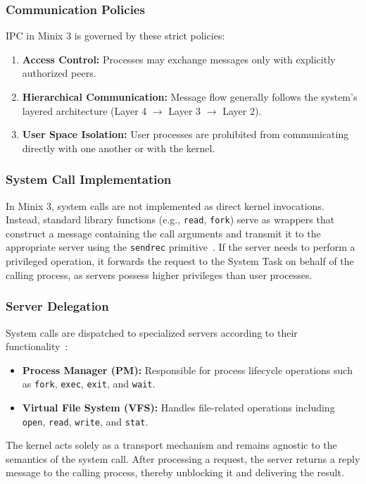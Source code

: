 \documentclass[a4paper,10pt,twoside]{report}
\theoremstyle{definition}
\begin{document}
\subsubsection{Communication Policies}
IPC in Minix 3 is governed by these strict policies:
\begin{enumerate}
    \item \textbf{Access Control:} Processes may exchange messages only with explicitly authorized peers.
    \item \textbf{Hierarchical Communication:} Message flow generally follows the system's layered architecture (Layer 4 $\rightarrow$ Layer 3 $\rightarrow$ Layer 2).
    \item \textbf{User Space Isolation:} User processes are prohibited from communicating directly with one another or with the kernel.
\end{enumerate}

\subsubsection{System Call Implementation}
In Minix 3, system calls are not implemented as direct kernel invocations. Instead, standard library functions (e.g., \texttt{read}, \texttt{fork}) serve as wrappers that construct a message containing the call arguments and transmit it to the appropriate server using the \texttt{sendrec} primitive~\cite{minix_ipc}. If the server needs to perform a privileged operation, it forwards the request to the System Task on behalf of the calling process, as servers possess higher privileges than user processes.

\subsubsection{Server Delegation}
System calls are dispatched to specialized servers according to their functionality~\cite{minix_callnr}:
\begin{itemize}
    \item \textbf{Process Manager (PM):} Responsible for process lifecycle operations such as \texttt{fork}, \texttt{exec}, \texttt{exit}, and \texttt{wait}.
    \item \textbf{Virtual File System (VFS):} Handles file-related operations including \texttt{open}, \texttt{read}, \texttt{write}, and \texttt{stat}.
\end{itemize}
The kernel acts solely as a transport mechanism and remains agnostic to the semantics of the system call. After processing a request, the server returns a reply message to the calling process, thereby unblocking it and delivering the result.
\end{document}
